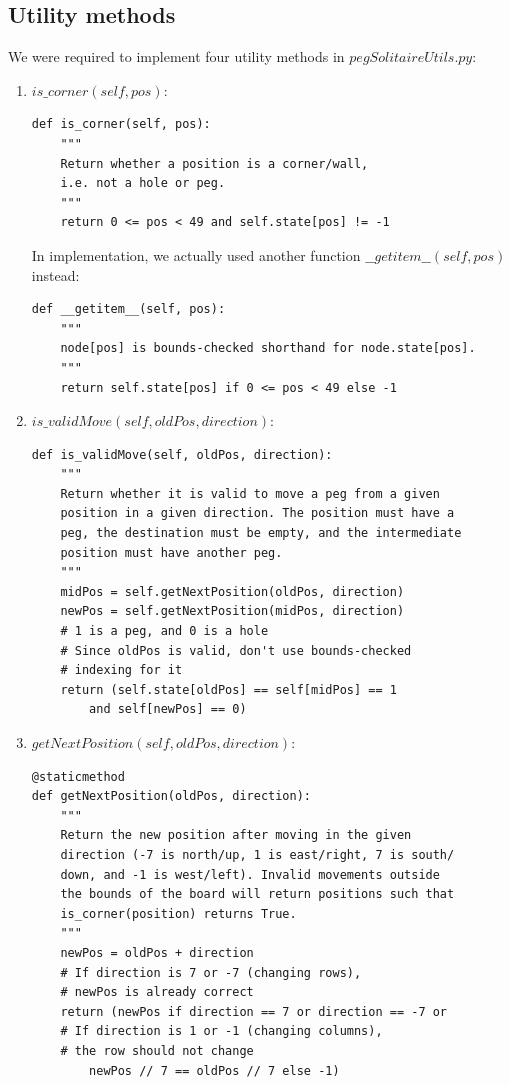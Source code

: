 \documentclass[11pt]{article}
\begin{document}
\subsection{Utility methods}

We were required to implement four utility methods in \(pegSolitaireUtils.py\):

\begin{enumerate}

\item \(is\_corner(self, pos)\):

\lstset{language=Python}
\begin{lstlisting}[frame=single]
def is_corner(self, pos):
	"""
	Return whether a position is a corner/wall,
	i.e. not a hole or peg.
	"""
	return 0 <= pos < 49 and self.state[pos] != -1
\end{lstlisting}

In implementation, we actually used another function
\(\_\_getitem\_\_(self, pos)\) instead:

\lstset{language=Python}
\begin{lstlisting}[frame=single]
def __getitem__(self, pos):
	"""
	node[pos] is bounds-checked shorthand for node.state[pos].
	"""
	return self.state[pos] if 0 <= pos < 49 else -1
\end{lstlisting}

\item \(is\_validMove(self, oldPos, direction)\):

\lstset{language=Python}
\begin{lstlisting}[frame=single]
def is_validMove(self, oldPos, direction):
	"""
	Return whether it is valid to move a peg from a given
	position in a given direction. The position must have a
	peg, the destination must be empty, and the intermediate
	position must have another peg.
	"""
	midPos = self.getNextPosition(oldPos, direction)
	newPos = self.getNextPosition(midPos, direction)
	# 1 is a peg, and 0 is a hole
	# Since oldPos is valid, don't use bounds-checked
	# indexing for it
	return (self.state[oldPos] == self[midPos] == 1
		and self[newPos] == 0)
\end{lstlisting}

\item \(getNextPosition(self, oldPos, direction)\):

\lstset{language=Python}
\begin{lstlisting}[frame=single]
@staticmethod
def getNextPosition(oldPos, direction):
	"""
	Return the new position after moving in the given
	direction (-7 is north/up, 1 is east/right, 7 is south/
	down, and -1 is west/left). Invalid movements outside
	the bounds of the board will return positions such that
	is_corner(position) returns True.
	"""
	newPos = oldPos + direction
	# If direction is 7 or -7 (changing rows),
	# newPos is already correct
	return (newPos if direction == 7 or direction == -7 or
	# If direction is 1 or -1 (changing columns),
	# the row should not change
		newPos // 7 == oldPos // 7 else -1)
\end{lstlisting}


\end{enumerate}
\end{document}
